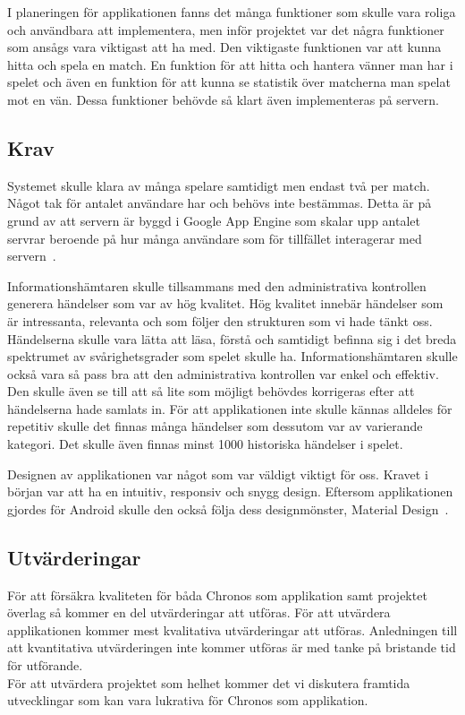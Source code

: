 \documentclass[a4paper, 11pt]{article}
\begin{document}
I planeringen för applikationen fanns det många funktioner som skulle vara roliga och användbara att implementera, men inför projektet var det några funktioner som ansågs vara viktigast att ha med. Den viktigaste funktionen var att kunna hitta och spela en match. En funktion för att hitta och hantera vänner man har i spelet och även en funktion för att kunna se statistik över matcherna man spelat mot en vän. Dessa funktioner behövde så klart även implementeras på servern.

\subsection{Krav}
Systemet skulle klara av många spelare samtidigt men endast två per match. Något tak för antalet användare har och behövs inte bestämmas. Detta är på grund av att servern är byggd i Google App Engine som skalar upp antalet servrar beroende på hur många användare som för tillfället interagerar med servern~\cite{appenginescalability}. 

Informationshämtaren skulle tillsammans med den administrativa kontrollen generera händelser som var av hög kvalitet. Hög kvalitet innebär händelser som är intressanta, relevanta och som följer den strukturen som vi hade tänkt oss. Händelserna skulle vara lätta att läsa, förstå och samtidigt befinna sig i det breda spektrumet av svårighetsgrader som spelet skulle ha. Informationshämtaren skulle också vara så pass bra att den administrativa kontrollen var enkel och effektiv. Den skulle även se till att så lite som möjligt behövdes korrigeras efter att händelserna hade samlats in. För att applikationen inte skulle kännas alldeles för repetitiv skulle det finnas många händelser som dessutom var av varierande kategori. Det skulle även finnas minst 1000 historiska händelser i spelet.

Designen av applikationen var något som var väldigt viktigt för oss. Kravet i början var att ha en intuitiv, responsiv och snygg design. Eftersom applikationen gjordes för Android skulle den också följa dess designmönster, Material Design~\cite{MaterialDesign}.

\subsection{Utvärderingar}
För att försäkra kvaliteten för båda Chronos som applikation samt projektet överlag så kommer en del utvärderingar att utföras. För att utvärdera applikationen kommer mest kvalitativa utvärderingar att utföras. Anledningen till att kvantitativa utvärderingen inte kommer utföras är med tanke på bristande tid för utförande.\\ För att utvärdera projektet som helhet kommer det vi diskutera framtida utvecklingar som kan vara lukrativa för Chronos som applikation.
\end{document}
